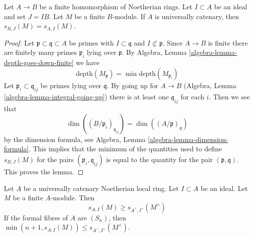 \begin{lemma}
\label{lemma-cutoff}
Let $A \to B$ be a finite homomorphism of Noetherian rings.
Let $I \subset A$ be an ideal and set $J = IB$. Let $M$ be
a finite $B$-module. If $A$ is universally catenary, then
$s_{B, J}(M) = s_{A, I}(M)$.
\end{lemma}

\begin{proof}
Let $\mathfrak p \subset \mathfrak q \subset A$ be primes with
$I \subset \mathfrak q$ and $I \not \subset \mathfrak p$.
Since $A \to B$ is finite there are finitely many primes
$\mathfrak p_i$ lying over $\mathfrak p$. By
Algebra, Lemma \ref{algebra-lemma-depth-goes-down-finite}
we have
$$
\text{depth}(M_\mathfrak p) = \min \text{depth}(M_{\mathfrak p_i})
$$
Let $\mathfrak p_i \subset \mathfrak q_{ij}$ be primes lying
over $\mathfrak q$. By going up for $A \to B$
(Algebra, Lemma \ref{algebra-lemma-integral-going-up})
there is at least one $\mathfrak q_{ij}$ for each $i$.
Then we see that
$$
\dim((B/\mathfrak p_i)_{\mathfrak q_{ij}}) =
\dim((A/\mathfrak p)_\mathfrak q)
$$
by the dimension formula, see
Algebra, Lemma \ref{algebra-lemma-dimension-formula}.
This implies that the minimum of the quantities
used to define $s_{B, J}(M)$
for the pairs $(\mathfrak p_i, \mathfrak q_{ij})$
is equal to the quantity for the pair $(\mathfrak p, \mathfrak q)$.
This proves the lemma.
\end{proof}

\begin{lemma}
\label{lemma-cutoff-completion}
Let $A$ be a universally catenary Noetherian local ring.
Let $I \subset A$ be an ideal. Let $M$ be
a finite $A$-module. Then
$$
s_{A, I}(M) \geq s_{A^\wedge, I^\wedge}(M^\wedge)
$$
If the formal fibres of $A$ are $(S_n)$, then
$\min(n + 1, s_{A, I}(M)) \leq s_{A^\wedge, I^\wedge}(M^\wedge)$.
\end{lemma}

